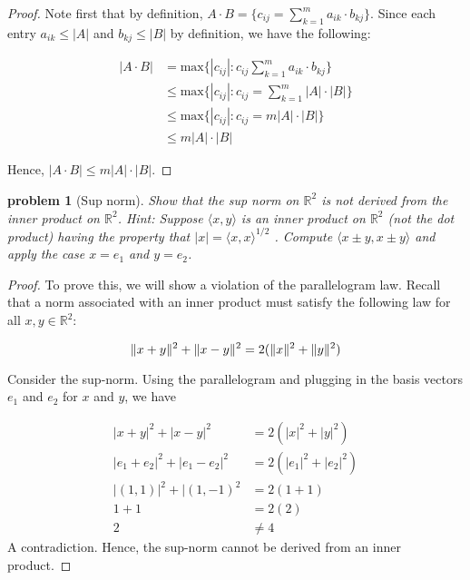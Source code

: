 \documentclass[10pt, oneside]{article}   	%
\newcommand{\innerprod}[2]{\langle #1, #2 \rangle}
\DeclarePairedDelimiter{\norm}{\lVert}{\rVert}
\newtheorem{problem}[theorem]{problem}
\begin{document}
\begin{proof}
Note first that by definition, $A \cdot B = \{ c_{ij} = \sum_{k = 1}^m a_{ik} \cdot b_{kj} \}$. Since each entry $a_{ik} \leq |A|$ and $b_{kj} \leq |B|$ by definition, we have the following: 

\begin{equation}
\begin{aligned}
	|A \cdot B| &= \text{max}\{ |c_{ij}| : c_{ij} \sum_{k = 1}^m a_{ik} \cdot b_{kj} \} \\
	&\leq \text{max}\{ |c_{ij}| : c_{ij} = \sum_{k = 1}^m |A| \cdot |B| \} \\
	&\leq \text{max}\{ |c_{ij}| : c_{ij} = m |A| \cdot |B|\} \\
	&\leq m |A|\cdot|B|
\end{aligned} 
\end{equation}

Hence, $|A \cdot B| \leq m |A| \cdot |B|$.

\end{proof}

\begin{problem}[Sup norm]
Show that the sup norm on $\mathbb{R}^2$ is not derived from the inner product on $\mathbb{R}^2$. Hint: Suppose $\innerprod{x}{y}$ is an inner product on $\mathbb{R}^2$ (\textit{not} the dot product) having the property that $|x| = \innerprod{x}{x}^{1/2}$ . Compute $\innerprod{x \pm y}{x \pm y}$ and apply the case $x = e_1$ and $y = e_2$.
\end{problem}

\begin{proof}

To prove this, we will show a violation of the parallelogram law. Recall that a norm associated with an inner product must satisfy the following law for all $x, y \in \mathbb{R}^2$: 

\begin{center}
\begin{equation}
 \norm{x + y}^2 + \norm{x - y}^2 = 2(\norm{x}^2 + \norm{y}^2)
 \end{equation}
 \end{center}
 
 Consider the sup-norm. Using the parallelogram and plugging in the basis vectors $e_1$ and $e_2$ for $x$ and $y$, we have 
 
 \begin{equation}
 	\begin{aligned}
		| x + y |^2 + | x - y|^2 &= 2(|x|^2 + |y|^2) \\
		| e_1 + e_2 |^2 + | e_1 - e_2|^2 &= 2(|e_1|^2 + |e_2|^2) \\
		| (1,1) |^2 + |(1,-1)^2 &= 2(1 + 1) \\
		1 + 1 &= 2(2) \\
		2 &\neq 4
	\end{aligned}
 \end{equation} 
 A contradiction. Hence, the sup-norm cannot be derived from an inner product.

\end{proof}
\end{document}
